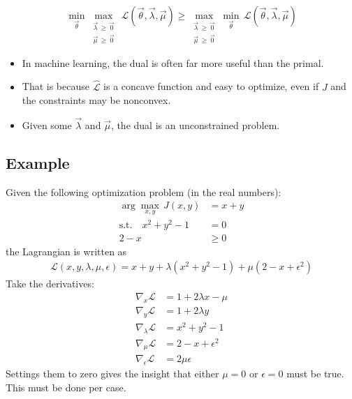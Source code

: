 			\begin{equation}
				\min_{\vec{\theta}} \max_{\substack{\vec{\lambda} \,\geq\, \vec{0} \\ \vec{\mu} \,\geq\, \vec{0}}} \, \mathcal{L}(\vec{\theta}, \vec{\lambda}, \vec{\mu}) \geq \max_{\substack{\vec{\lambda} \,\geq\, \vec{0} \\ \vec{\mu} \,\geq\, \vec{0}}} \min_{\vec{\theta}} \, \mathcal{L}(\vec{\theta}, \vec{\lambda}, \vec{\mu})
			\end{equation}
			\begin{itemize}
				\item In machine learning, the dual is often far more useful than the primal.
				\item That is because \(\hat{\mathcal{L}}\) is a concave function and easy to optimize, even if \(J\) and the constraints may be nonconvex.
				\item Given some \(\vec{\lambda}\) and \(\vec{\mu}\), the dual is an unconstrained problem.
			\end{itemize}

		\subsection{Example}
			Given the following optimization problem (in the real numbers):
			\begin{align}
				\arg\max\limits_{x, y} \, J(x, y) &= x + y \\
				\textrm{s.t.} \quad
				x^2 + y^2 - 1 &= 0 \\
				2 - x &\geq 0
			\end{align}
			the Lagrangian is written as
			\begin{align}
				\mathcal{L}(x, y, \lambda, \mu, \epsilon) = x + y + \lambda (x^2 + y^2 - 1) + \mu (2 - x + \epsilon^2)
			\end{align}
			Take the derivatives:
			\begin{align}
				\nabla_x \mathcal{L}       & = 1 + 2 \lambda x - \mu \\
				\nabla_y \mathcal{L}       & = 1 + 2 \lambda y \\
				\nabla_\lambda \mathcal{L} & = x^2 + y^2 - 1 \\
				\nabla_\mu \mathcal{L}     & = 2 - x + \epsilon^2 \\
				\nabla_\epsilon \mathcal{L} &= 2\mu\epsilon
			\end{align}
			Settings them to zero gives the insight that either \( \mu = 0 \) or \( \epsilon = 0 \) must be true. This must be done per case.
			
